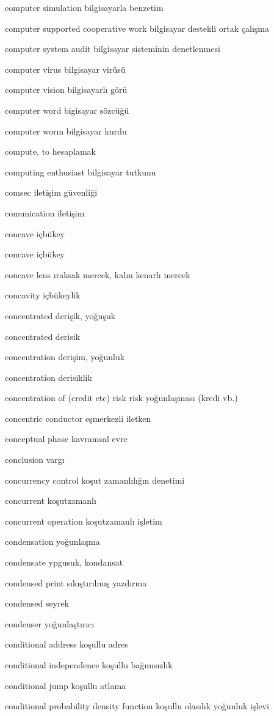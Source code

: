 \documentclass[12pt,fleqn]{article}\usepackage{../../common}
\begin{document}
computer simulation bilgisayarla benzetim

computer supported cooperative work bilgisayar destekli ortak çalışma

computer system audit bilgisayar sisteminin denetlenmesi

computer virus bilgisayar virüsü

computer vision bilgisayarlı görü

computer word bigisayar sözcüğü

computer worm bilgisayar kurdu

compute, to hesaplamak

computing enthusiast bilgisayar tutkunu

comsec iletişim güvenliği

comunication iletişim

concave içbükey

concave içbükey

concave lens ıraksak mercek, kalın kenarlı mercek

concavity içbükeylik

concentrated derişik, yoğuşuk

concentrated derisik

concentration derişim, yoğunluk

concentration derisiklik

concentration of (credit etc) risk risk yoğunlaşması (kredi vb.)

concentric conductor eşmerkezli iletken

conceptual phase kavramsal evre

conclusion vargı

concurrency control koşut zamanlılığın denetimi

concurrent koşutzamanlı

concurrent operation koşutzamanlı işletim

condensation yoğunlaşma

condensate ypgusuk, kondansat

condensed print sıkıştırılmış yazdırma

condensed seyrek

condenser yoğunlaştırıcı

conditional address koşullu adres

conditional independence koşullu bağımsızlık

conditional jump koşullu atlama

conditional probability density function koşullu olasılık yoğunluk işlevi
\end{document}
